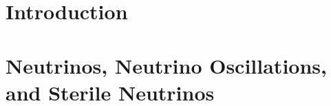 \documentclass[11pt,openright,oneside,letterpaper,onecolumn]{report}  %
\begin{document}

\pagestyle{empty}

\thesistitlepage
\thesiscopyrightpage



\pagestyle{plain}

\setlength{\footskip}{0.5in}

\setcounter{tocdepth}{2}
\renewcommand{\contentsname}{Table of Contents}
\tableofcontents
\clearpage

\listoffigures
\cleardoublepage

\listoftables
\cleardoublepage


\cleardoublepage



\pagestyle{headings}

%
%
\setlength{\textheight}{8.5in}
\setlength{\footskip}{0in}




 {%
\fancyhf{}
\fancyhead[LE,RO]{\thepage}
\fancyhead[RE,LO]{\itshape \leftmark}
\renewcommand{\headrulewidth}{0pt}
}
\pagestyle{plain}

\chapter{Introduction}
\label{section:intro}


\chapter{Neutrinos, Neutrino Oscillations, and Sterile Neutrinos}
\label{sec:theory}

\end{document}
